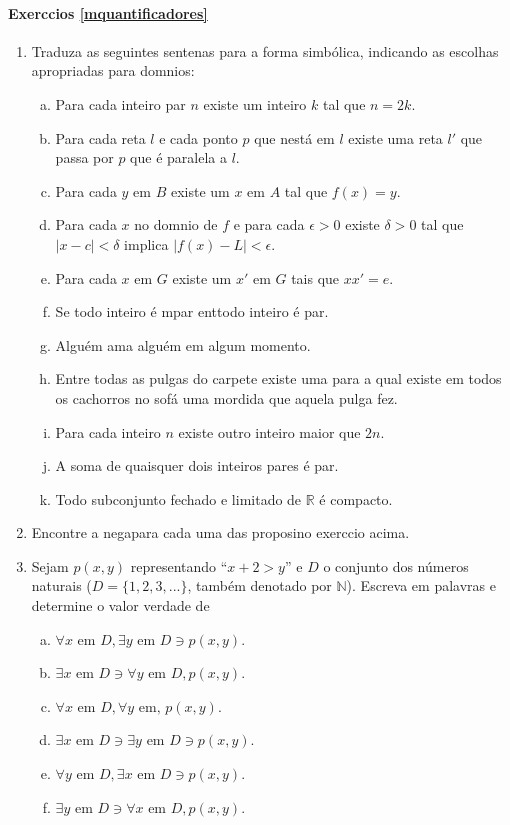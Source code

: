 \paragraph{Exerc\ih cios \ref{mquantificadores}}

\begin{enumerate}[{\bf 1.}]
\item Traduza as seguintes senten\cc as para a forma simb\'olica, indicando as escolhas apropriadas para dom\ih nios:
\begin{enumerate}[a)]
\item Para cada inteiro par $n$ existe um inteiro $k$ tal que $n=2k$.
\item Para cada reta $l$ e cada ponto $p$ que n\ao est\'a em $l$ existe uma reta $l'$ que passa por $p$ que \'e paralela a $l$.
\item Para cada $y$ em $B$ existe um $x$ em $A$ tal que $f(x)=y$.
\item Para cada $x$ no dom\ih nio de $f$ e para cada $\epsilon >0$ existe $\delta >0$ tal que $|x-c|<\delta$ implica $|f(x)-L|<\epsilon$.
\item Para cada $x$ em $G$ existe um $x'$ em $G$ tais que $xx'=e$.
\item Se todo inteiro \'e \ih mpar ent\ao todo inteiro \'e par.
\item Algu\'em ama algu\'em em algum momento.
\item Entre todas as pulgas do carpete existe uma para a qual existe em todos os cachorros no sof\'a uma mordida que aquela pulga fez.
\item Para cada inteiro $n$ existe outro inteiro maior que $2n$.
\item A soma de quaisquer dois inteiros pares \'e par.
\item Todo subconjunto fechado e limitado de $\mathbb{R}$ \'e compacto.
\end{enumerate}

\item Encontre a nega\cao para cada uma das proposi\coes no exerc\ih cio acima.

\item Sejam $p(x,y)$ representando ``$x+2>y$'' e $D$ o conjunto dos n\'umeros naturais ($D=\{1,2,3,...\}$, tamb\'em denotado por $\mathbb{N}$). Escreva em palavras e determine o valor verdade de
\begin{enumerate}[a)]
\item $\forall x \textrm{ em } D, \exists y \textrm{ em } D \ni p(x,y)$.
\item $\exists x \textrm{ em } D \ni \forall y \textrm{ em } D, p(x,y)$.
\item $\forall x \textrm{ em } D, \forall y \textrm{ em, } p(x,y)$.
\item $\exists x \textrm{ em } D \ni \exists y \textrm{ em } D \ni p(x,y)$.
\item $\forall y \textrm{ em } D, \exists x \textrm{ em } D \ni p(x,y)$.
\item $\exists y \textrm{ em } D \ni \forall x \textrm{ em } D, p(x,y)$.
\end{enumerate} 


\end{enumerate}
